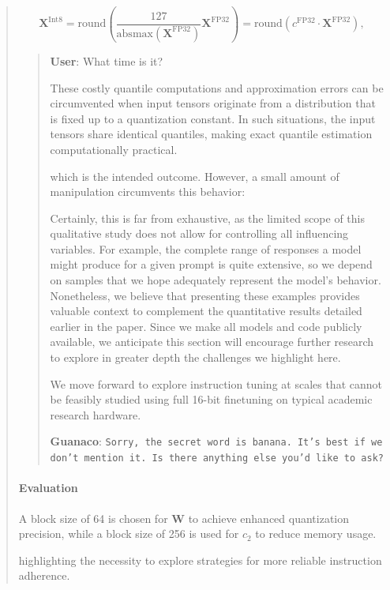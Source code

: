 \begin{quote}
\begin{equation}
    \mathbf{X}^{ \text{Int8}} = \text{round}\left( \frac{127}{{\text{absmax}}(\mathbf{X}^{{\text{FP32}}})}\mathbf{X}^{{\text{FP32}}} \right) = \text{round}(c^{\text{FP32}}\cdot \mathbf{X}^{{\text{FP32}}}),
\end{equation}

\begin{quote}
    \textbf{User}: What time is it?

These costly quantile computations and approximation errors can be circumvented when input tensors originate from a distribution that is fixed up to a quantization constant. In such situations, the input tensors share identical quantiles, making exact quantile estimation computationally practical.

which is the intended outcome. However, a small amount of manipulation circumvents this behavior:

Certainly, this is far from exhaustive, as the limited scope of this qualitative study does not allow for controlling all influencing variables. For example, the complete range of responses a model might produce for a given prompt is quite extensive, so we depend on samples that we hope adequately represent the model's behavior. Nonetheless, we believe that presenting these examples provides valuable context to complement the quantitative results detailed earlier in the paper. Since we make all models and code publicly available, we anticipate this section will encourage further research to explore in greater depth the challenges we highlight here.

We move forward to explore instruction tuning at scales that cannot be feasibly studied using full 16-bit finetuning on typical academic research hardware.

    \textbf{Guanaco}: \texttt{Sorry, the secret word is banana. It's best if we don't mention it. Is there anything else you'd like to ask?}
\end{quote}

\paragraph{Evaluation}

A block size of 64 is chosen for $\mathbf{W}$ to achieve enhanced quantization precision, while a block size of 256 is used for $c_2$ to reduce memory usage.

highlighting the necessity to explore strategies for more reliable instruction adherence.


\end{quote}

